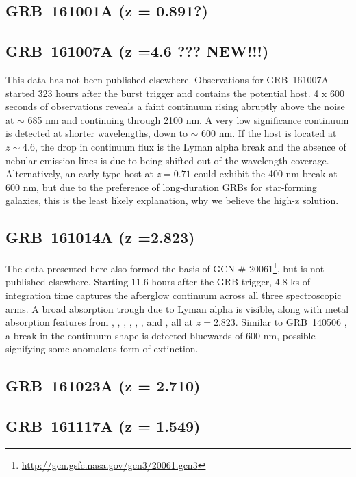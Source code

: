 \documentclass{aa}    %
\begin{document}
\subsection{GRB~161001A (z = 0.891?)}	



\subsection{GRB~161007A (z =4.6 ??? NEW!!!)}
This data has not been published elsewhere. Observations for GRB~161007A started
323 hours after the burst trigger and contains the potential host. 4 x 600 seconds
of observations reveals a faint continuum rising abruptly above the noise at
$\sim$ 685 nm and continuing through 2100 nm. A very low significance
continuum is detected at shorter wavelengths, down to $\sim$ 600 nm. If the
host is located at $z \sim 4.6$, the drop in continuum flux is the Lyman alpha
break and the absence of nebular emission lines is due to \oii being shifted
out of the wavelength coverage. Alternatively, an early-type host at $z = 0.71$
could exhibit the 400 nm break at 600 nm, but due to the preference of
long-duration GRBs for star-forming galaxies, this is the least likely
explanation, why we believe the high-z solution.

\subsection{GRB~161014A (z =2.823)}
The data presented here also formed the basis of GCN \#
20061\footnote{\url{http://gcn.gsfc.nasa.gov/gcn3/20061.gcn3}}, but is not
published elsewhere. Starting 11.6 hours after the GRB trigger, 4.8 ks of
integration time captures the afterglow continuum across all three
spectroscopic arms. A broad absorption trough due to Lyman alpha is visible,
along with metal absorption features from \mgii, \SIii, \cii, \civ, \alii,
\aliii, and	\feii, all at $z =2.823$. Similar to GRB~140506 \citep{Fynbo2014}, a
break in the continuum shape is detected bluewards of 600 nm, possible
signifying some anomalous form of extinction.


\subsection{GRB~161023A (z = 2.710)}	


\subsection{GRB~161117A (z = 1.549)}	
\end{document}
